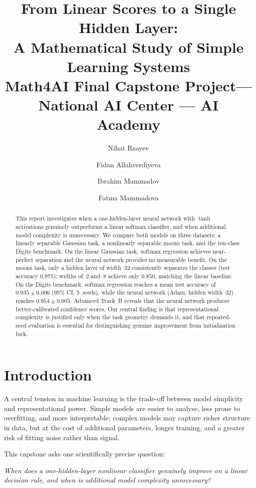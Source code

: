 \documentclass[11pt]{article}
\title{\textbf{From Linear Scores to a Single Hidden Layer:}\\[4pt]
       \large A Mathematical Study of Simple Learning Systems\\[8pt]
       \normalsize Math4AI Final Capstone Project\quad---\quad
       National AI Center --- AI Academy}
\author{Nihat Rzayev \and Fidan Allahverdiyeva \and
        Ibrahim Mammadov \and Fatma Mammadova}
\date{}
\begin{document}
\maketitle
\thispagestyle{empty}

\begin{abstract}
This report investigates when a one-hidden-layer neural network with $\tanh$
activations genuinely outperforms a linear softmax classifier, and when
additional model complexity is unnecessary.
We compare both models on three datasets: a linearly separable Gaussian task,
a nonlinearly separable moons task, and the ten-class Digits benchmark.
On the linear Gaussian task, softmax regression achieves near-perfect separation
and the neural network provides no measurable benefit.
On the moons task, only a hidden layer of width~32 consistently separates the
classes (test accuracy $0.975$); widths of~2 and~8 achieve only $0.850$,
matching the linear baseline.
On the Digits benchmark, softmax regression reaches a mean test accuracy of
$0.935\pm0.006$ (95\% CI, 5~seeds), while the neural network (Adam, hidden
width~32) reaches $0.954\pm0.005$.
Advanced Track~B reveals that the neural network produces better-calibrated
confidence scores.
Our central finding is that representational complexity is justified only when
the task geometry demands it, and that repeated-seed evaluation is essential
for distinguishing genuine improvement from initialization luck.
\end{abstract}

\tableofcontents
\newpage

\section{Introduction}
\label{sec:intro}

A central tension in machine learning is the trade-off between model simplicity
and representational power.
Simple models are easier to analyse, less prone to overfitting, and more
interpretable; complex models may capture richer structure in data, but at the
cost of additional parameters, longer training, and a greater risk of fitting
noise rather than signal.

This capstone asks one scientifically precise question:
\begin{center}
\itshape
When does a one-hidden-layer nonlinear classifier genuinely improve on a linear
decision rule, and when is additional model complexity unnecessary?
\end{center}
\end{document}
